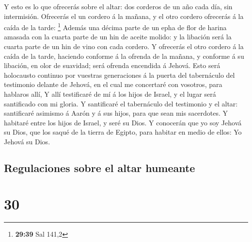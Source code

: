  Y esto es lo que ofrecerás sobre el altar: dos corderos de
un año cada día, sin intermisión.  Ofrecerás el un cordero
á la mañana, y el otro cordero ofrecerás á la caída de la tarde:
\footnote{\textbf{29:39} Sal 141,2}  Además una décima
parte de un epha de flor de harina amasada con la cuarta parte de un hin
de aceite molido: y la libación será la cuarta parte de un hin de vino
con cada cordero.  Y ofrecerás el otro cordero á la caída
de la tarde, haciendo conforme á la ofrenda de la mañana, y conforme á
su libación, en olor de suavidad; será ofrenda encendida á Jehová.
 Esto será holocausto continuo por vuestras generaciones á
la puerta del tabernáculo del testimonio delante de Jehová, en el cual
me concertaré con vosotros, para hablaros allí,  Y allí
testificaré de mí á los hijos de Israel, y el lugar será santificado con
mi gloria.  Y santificaré el tabernáculo del testimonio y
el altar: santificaré asimismo á Aarón y á sus hijos, para que sean mis
sacerdotes.  Y habitaré entre los hijos de Israel, y seré
su Dios.  Y conocerán que yo soy Jehová su Dios, que los
saqué de la tierra de Egipto, para habitar en medio de ellos: Yo Jehová
su Dios.

\hypertarget{regulaciones-sobre-el-altar-humeante}{%
\subsection{Regulaciones sobre el altar
humeante}\label{regulaciones-sobre-el-altar-humeante}}

\hypertarget{section-29}{%
\section{30}\label{section-29}}

